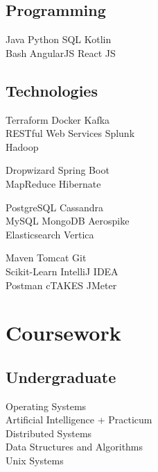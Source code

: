 \documentclass[]{rajnikant-resume-openfont}
\begin{document}
\begin{minipage}[t]{0.33\textwidth}
\subsection{Programming}
Java \textbullet{}  Python \textbullet{} SQL \textbullet{} Kotlin \\ 
Bash \textbullet{} AngularJS \textbullet{} React JS 
\sectionsep

\subsection{Technologies}
 Terraform   \textbullet{}  Docker \textbullet{}  Kafka  \\
 RESTful Web Services \textbullet{} Splunk \\
 Hadoop
 \sectionsep
 
  Dropwizard \textbullet{} Spring Boot \\ 
 MapReduce  \textbullet{} Hibernate
\sectionsep

 PostgreSQL \textbullet{}Cassandra \\
  MySQL \textbullet{} MongoDB \textbullet{} Aerospike \\
   Elasticsearch \textbullet{} Vertica
 \sectionsep
 
 \sectionsep
 
  \sectionsep
 
      Maven \textbullet{} Tomcat \textbullet{} Git \\
       Scikit-Learn  \textbullet{} IntelliJ IDEA \\
      Postman \textbullet{} cTAKES \textbullet{} JMeter 
\sectionsep



\section{Coursework}
\subsection{Undergraduate}
Operating Systems \\
Artificial Intelligence + Practicum \\
Distributed Systems \\
Data Structures and Algorithms\\
Unix Systems 
\sectionsep



%
%

\end{minipage} 
\end{document}
